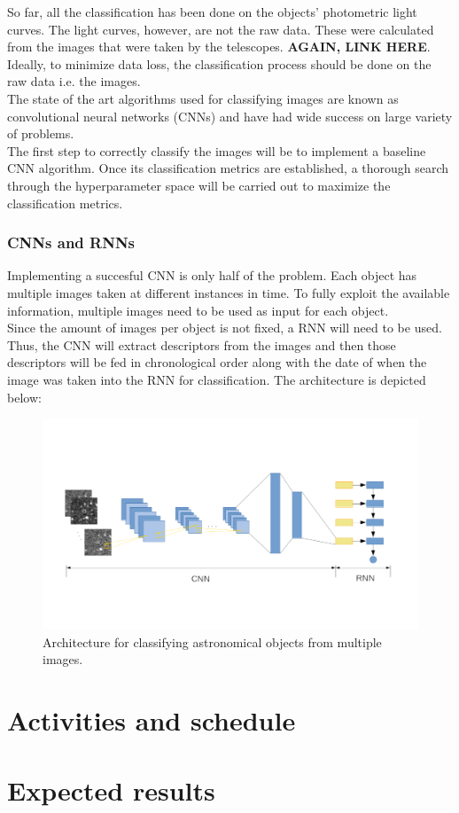 So far, all the classification has been done on the objects' photometric light curves. The light curves, however, are not the raw data. These were calculated from the images that were taken by the telescopes. \textbf{AGAIN, LINK HERE}. Ideally, to minimize data loss, the classification process should be done on the raw data i.e. the images.\\ 

The state of the art algorithms used for classifying images are known as convolutional neural networks (CNNs) \cite{CNN} and have had wide success on large variety of problems.\\

The first step to correctly classify the images will be to implement a baseline CNN algorithm. Once its classification  metrics are established, a thorough search through the hyperparameter space will be carried out to maximize the classification metrics.

\subsubsection{CNNs and RNNs}

Implementing a succesful CNN is only half of the problem. Each object has multiple images taken at different instances in time. To fully exploit the available information, multiple images need to be used as input for each object.\\

Since the amount of images per object is not fixed, a RNN will need to be used. Thus, the CNN will extract descriptors from the images and then those descriptors will be fed in chronological order along with the date of when the image was taken into the RNN for classification. The architecture is depicted below:

\begin{figure}[H]
  \centering
  \includegraphics[width=1.05\textwidth]{CNNRNNDiagram.png}
  \caption{Architecture for classifying astronomical objects from multiple images.}
\end{figure}

\section{Activities and schedule}
\section{Expected results}


\newpage
\printbibliography

